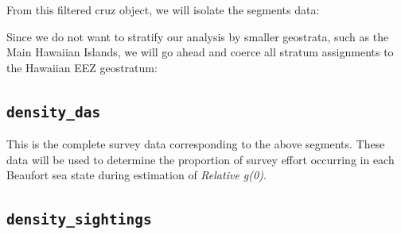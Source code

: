 \documentclass[
]{book}
\newenvironment{Shaded}{\begin{snugshade}}{\end{snugshade}}
\newcommand{\NormalTok}[1]{#1}
\newcommand{\OtherTok}[1]{\textcolor[rgb]{0.56,0.35,0.01}{#1}}
\newcommand{\SpecialCharTok}[1]{\textcolor[rgb]{0.00,0.00,0.00}{#1}}
\newcommand{\StringTok}[1]{\textcolor[rgb]{0.31,0.60,0.02}{#1}}
\begin{document}
From this filtered cruz object, we will isolate the segments data:

\begin{Shaded}
\end{Shaded}

Since we do not want to stratify our analysis by smaller geostrata, such as the Main Hawaiian Islands, we will go ahead and coerce all stratum assignments to the Hawaiian EEZ geostratum:

\begin{Shaded}
\end{Shaded}

\hypertarget{density_das}{%
\subsection*{\texorpdfstring{\texttt{density\_das}}{density\_das}}\label{density_das}}

This is the complete survey data corresponding to the above segments. These data will be used to determine the proportion of survey effort occurring in each Beaufort sea state during estimation of \emph{Relative g(0)}.

\begin{Shaded}
\end{Shaded}

\hypertarget{density_sightings}{%
\subsection*{\texorpdfstring{\texttt{density\_sightings}}{density\_sightings}}\label{density_sightings}}
\end{document}
